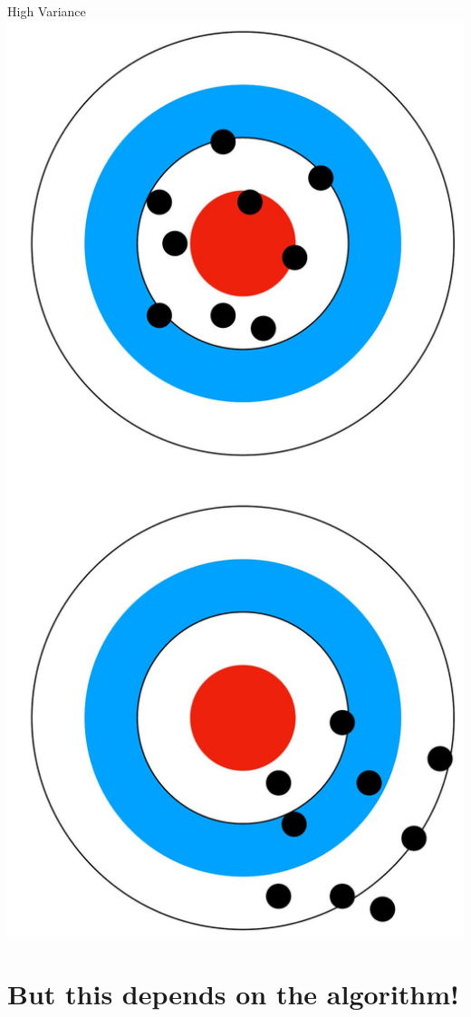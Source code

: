 \documentclass[10pt]{article}
\begin{document}
High Variance
\includegraphics[max width=\textwidth, center]{2023_12_30_442f876157646883c2c9g-29(2)}

\section*{But this depends on the algorithm!}
\end{document}
